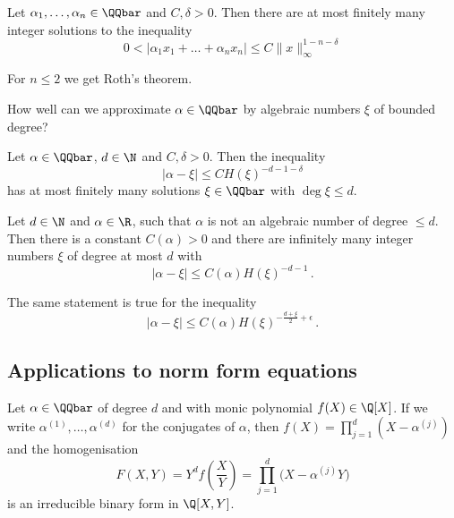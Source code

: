 \begin{thm}
	Let \( \alpha_1, \dotsc, \alpha_n \in \QQbar \) and \( C,\delta > 0 \).
	Then there are at most finitely many integer solutions to the inequality
	\[ 0 < \big| \alpha_1 x_1 + \dots + \alpha_n x_n \big| \leq C \|x\|_\infty^{1-n-\delta} \]
\end{thm}

\begin{rem*}
	For \( n \leq 2 \) we get Roth's theorem.
\end{rem*}

\begin{frage*}
	How well can we approximate \( \alpha \in \QQbar \) by algebraic numbers \( \xi \) of bounded degree?
\end{frage*}

\begin{thm}
	Let \( \alpha \in \QQbar \), \( d \in \N \) and \( C,\delta > 0 \).
	Then the inequality
	\[ \big| \alpha - \xi \big| \leq CH(\xi)^{-d-1-\delta} \]
	has at most finitely many solutions \( \xi \in \QQbar \) with \( \deg \xi \leq d \).
\end{thm}

\begin{conj*}
	Let \( d \in \N \) and \( \alpha \in \R \), such that \( \alpha \) is not an algebraic number of degree \( \leq d \).
	Then there is a constant \( C(\alpha) > 0 \) and there are infinitely many integer numbers \( \xi \) of degree at most \( d \) with
	\[ \big| \alpha - \xi \big| \leq C(\alpha) H(\xi)^{-d-1} \,. \]
\end{conj*}

\begin{conj*}[Wirsing, 1961]
	The same statement is true for the inequality
	\[ \big| \alpha - \xi \big| \leq C(\alpha) H(\xi)^{-\frac{d + \xi}{2} + \epsilon} \,. \]
\end{conj*}


\subsection*{Applications to norm form equations}

Let \( \alpha \in \QQbar \) of degree \( d \) and with monic polynomial \( f(X) \in \Q[X] \).
If we write \( \alpha^{(1)}, \dotsc, \alpha^{(d)} \) for the conjugates of \( \alpha \), then \( f(X) = \prod_{j=1}^{d} (X-\alpha^{(j)}) \) and the homogenisation
\[ F(X, Y) = Y^d f\left( \frac{X}{Y} \right) = \prod_{j=1}^{d} \big(X - \alpha^{(j)}Y \big) \]
is an irreducible binary form in \( \Q[X,Y] \).

